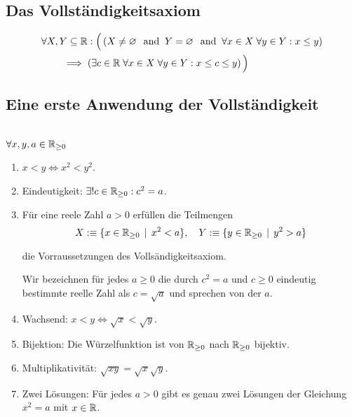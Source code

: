 \subsection{Das Vollständigkeitsaxiom}

\[
  \begin{aligned}
    &\forall X,Y \subseteq \mathbb{R}: \Big( \left( X \neq \varnothing \;\;\, \text{and}\;\; Y = \varnothing \;\;\, \text{and}\;\; \forall x \in X \; \forall y \in Y: x \leq y \right) \\
    &\qquad \implies \left(\exists c \in \mathbb{R} \; \forall x \in X \; \forall y \in Y: x \leq c \leq y \right) \Big)
  \end{aligned}
\]

\subsection{Eine erste Anwendung der Vollständigkeit}

\begin{imp-ex}
  \phantom{.}\\
  $\forall x,y,a \in \mathbb{R}_{\geq0}$
\begin{enumerate}
  \item $x<y \iff x^2 < y^2$.
  \item Eindeutigkeit: $\exists! c \in \mathbb{R}_{\geq 0}: c^2 = a$.
  \item Für eine reele Zahl $a>0$ erfüllen die Teilmengen \[
  X :\equiv \{x \in \mathbb{R}_{\geq 0} \, \mid \, x^2 < a \}, \quad Y :\equiv \{y \in \mathbb{R}_{\geq 0} \, \mid \, y^2 > a \}
  \]

  die Vorraussetzungen des Vollsändigkeitsaxiom.

\begin{mydef-non}
    Wir bezeichnen für jedes $a \geq 0$ die durch $c^2 = a$ und $c \geq 0$ eindeutig bestimmte reelle Zahl als $c=\sqrt{a}$ und sprechen von der  $a$.
\end{mydef-non}

  \item Wachsend: $x < y \iff \sqrt{x} < \sqrt{y}$.
  \item Bijektion: Die Würzelfunktion ist von $\mathbb{R}_{\geq 0}$ nach $\mathbb{R}_{\geq 0}$ bijektiv.
  \item Multiplikativität: $\sqrt{xy} = \sqrt{x}\sqrt{y}$.
  \item Zwei Lösungen: Für jedes $a>0$ gibt es genau zwei Lösungen der Gleichung $x^2 = a$ mit $x \in \mathbb{R}$.
\end{enumerate}
\end{imp-ex}